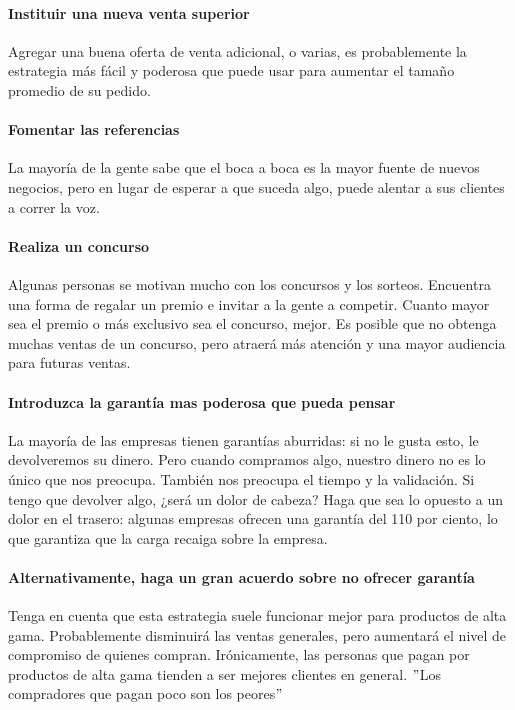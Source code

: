 \documentclass[10pt]{book}
\begin{document}
	    \paragraph{Instituir una nueva venta superior}
		Agregar una buena oferta de venta adicional, o varias, es probablemente la estrategia más fácil y poderosa que puede usar para aumentar el tamaño promedio de su pedido.

	    \paragraph{Fomentar las referencias}
		La mayoría de la gente sabe que el boca a boca es la mayor fuente de nuevos negocios, pero en lugar de esperar a que suceda algo, puede alentar a sus clientes a correr la voz. 
		
	    \paragraph{Realiza un concurso}
		Algunas personas se motivan mucho con los concursos y los sorteos. Encuentra una forma de regalar un premio e invitar a la gente a competir. Cuanto mayor sea el premio o más exclusivo sea el concurso, mejor. Es posible que no obtenga muchas ventas de un concurso, pero atraerá más atención y una mayor audiencia para futuras ventas.

	    \paragraph{Introduzca la garantía mas poderosa que pueda pensar}
		La mayoría de las empresas tienen garantías aburridas: si no le gusta esto, le devolveremos su dinero. Pero cuando compramos algo, nuestro dinero no es lo único que nos preocupa. También nos preocupa el tiempo y la validación. Si tengo que devolver algo, ¿será un dolor de cabeza? Haga que sea lo opuesto a un dolor en el trasero: algunas empresas ofrecen una garantía del 110 por ciento, lo que garantiza que la carga recaiga sobre la empresa.

	    \paragraph{Alternativamente, haga un gran acuerdo sobre no ofrecer garantía}
		Tenga en cuenta que esta estrategia suele funcionar mejor para productos de alta gama. Probablemente disminuirá las ventas generales, pero aumentará el nivel de compromiso de quienes compran. Irónicamente, las personas que pagan por productos de alta gama tienden a ser mejores clientes en general. $"$Los compradores que pagan poco son los peores$"$
\end{document}
